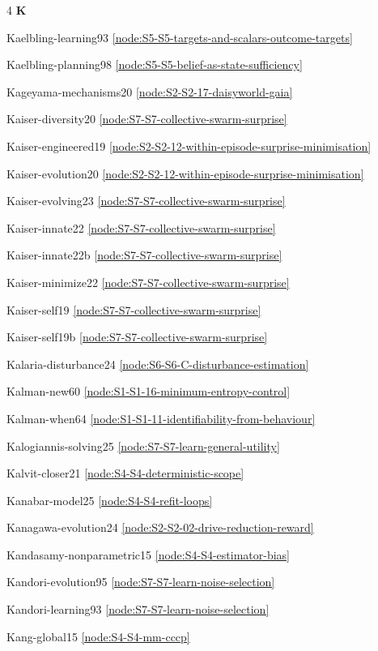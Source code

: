 \documentclass[10pt]{article}
\begin{document}
{\begin{multicols}{4}
\smallskip\textbf{K}\par
Kaelbling-learning93 \hfill \ref{node:S5-S5-targets-and-scalars-outcome-targets}\par
Kaelbling-planning98 \hfill \ref{node:S5-S5-belief-as-state-sufficiency}\par
Kageyama-mechanisms20 \hfill \ref{node:S2-S2-17-daisyworld-gaia}\par
Kaiser-diversity20 \hfill \ref{node:S7-S7-collective-swarm-surprise}\par
Kaiser-engineered19 \hfill \ref{node:S2-S2-12-within-episode-surprise-minimisation}\par
Kaiser-evolution20 \hfill \ref{node:S2-S2-12-within-episode-surprise-minimisation}\par
Kaiser-evolving23 \hfill \ref{node:S7-S7-collective-swarm-surprise}\par
Kaiser-innate22 \hfill \ref{node:S7-S7-collective-swarm-surprise}\par
Kaiser-innate22b \hfill \ref{node:S7-S7-collective-swarm-surprise}\par
Kaiser-minimize22 \hfill \ref{node:S7-S7-collective-swarm-surprise}\par
Kaiser-self19 \hfill \ref{node:S7-S7-collective-swarm-surprise}\par
Kaiser-self19b \hfill \ref{node:S7-S7-collective-swarm-surprise}\par
Kalaria-disturbance24 \hfill \ref{node:S6-S6-C-disturbance-estimation}\par
Kalman-new60 \hfill \ref{node:S1-S1-16-minimum-entropy-control}\par
Kalman-when64 \hfill \ref{node:S1-S1-11-identifiability-from-behaviour}\par
Kalogiannis-solving25 \hfill \ref{node:S7-S7-learn-general-utility}\par
Kalvit-closer21 \hfill \ref{node:S4-S4-deterministic-scope}\par
Kanabar-model25 \hfill \ref{node:S4-S4-refit-loops}\par
Kanagawa-evolution24 \hfill \ref{node:S2-S2-02-drive-reduction-reward}\par
Kandasamy-nonparametric15 \hfill \ref{node:S4-S4-estimator-bias}\par
Kandori-evolution95 \hfill \ref{node:S7-S7-learn-noise-selection}\par
Kandori-learning93 \hfill \ref{node:S7-S7-learn-noise-selection}\par
Kang-global15 \hfill \ref{node:S4-S4-mm-cccp}\par

\end{multicols}}
\end{document}
